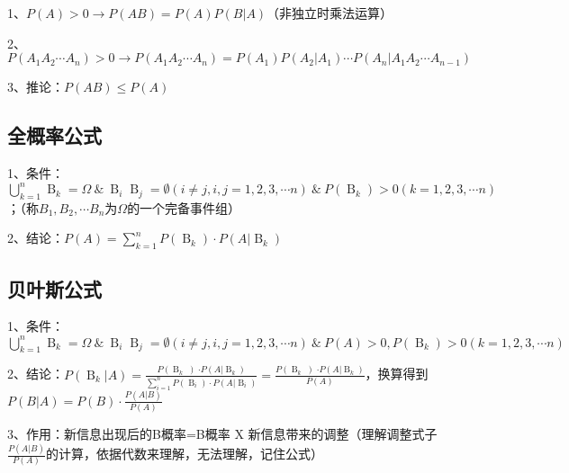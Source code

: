 1、$P(A)>0 \rightarrow P(AB)=P(A)P(B|A)$（非独立时乘法运算）

2、$P(A_1A_2\cdots A_n) > 0 \rightarrow P(A_1A_2\cdots A_n)=P(A_1)P(A_2|A_1)\cdots P(A_n|A_1A_2\cdots A_{n-1})$

3、推论：$P(AB) \le P(A)$



\subsection{全概率公式}

1、条件：$\mathop{ \bigcup }\limits_{{k=1}}^{{n}}\mathop{{B}}\nolimits_{{k}}=\Omega \ \& \ \mathop{{B}}\nolimits_{{i}}\mathop{{B}}\nolimits_{{j}}= \emptyset { \left( {i \neq j,i,j=1,2,3, \cdots n} \right) } \ \& \ P{ \left( {\mathop{{B}}\nolimits_{{k}}} \right) } > 0{ \left( {k=1,2,3, \cdots n} \right) }$；（称$B_1,B_2,\cdots B_n$为$\Omega$的一个完备事件组）

2、结论：$P{ \left( {A} \right) }=\mathop{ \sum }\limits_{{k=1}}^{{n}}P{ \left( {\mathop{{B}}\nolimits_{{k}}} \right) } \cdot P{ \left( {A \left| \mathop{{B}}\nolimits_{{k}}\right. } \right) }$



\subsection{贝叶斯公式}

1、条件：$\mathop{ \bigcup }\limits_{{k=1}}^{{n}}\mathop{{B}}\nolimits_{{k}}=\Omega \ \& \ \mathop{{B}}\nolimits_{{i}}\mathop{{B}}\nolimits_{{j}}= \emptyset { \left( {i \neq j,i,j=1,2,3, \cdots n} \right) } \ \& \ P(A) > 0,P{ \left( {\mathop{{B}}\nolimits_{{k}}} \right) } > 0{ \left( {k=1,2,3, \cdots n} \right) }$

2、结论：$P{ \left( {\mathop{{B}}\nolimits_{{k}} \left| A\right. } \right) }=\frac{{P \left( {\mathop{{B}}\nolimits_{{k}}} \left) \cdot P{ \left( {A \left| {\mathop{{B}}\nolimits_{{k}}}\right. } \right) }\right. \right. }}{{\mathop{ \sum }\limits_{{i=1}}^{{n}}P{ \left( {\mathop{{B}}\nolimits_{{i}}} \right) } \cdot P{ \left( {A \left| \mathop{{B}}\nolimits_{{i}}\right. } \right) }}}=\frac{{P \left( {\mathop{{B}}\nolimits_{{k}}} \left) \cdot P{ \left( {A \left| {\mathop{{B}}\nolimits_{{k}}}\right. } \right) }\right. \right. }}{P(A)}$，换算得到$P(B|A)=P(B)\cdot \frac{P(A|B)}{P(A)}$

3、作用：新信息出现后的B概率=B概率 X 新信息带来的调整（理解调整式子$\frac{P(A|B)}{P(A)}$的计算，依据代数来理解，无法理解，记住公式）

